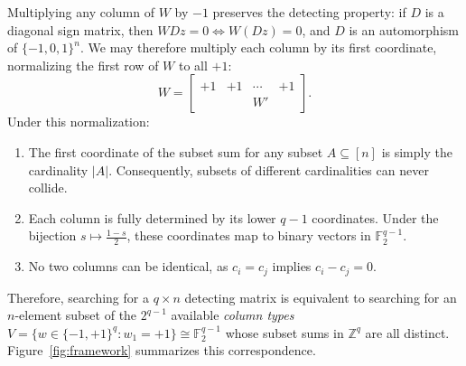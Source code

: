\documentclass[11pt]{article}
\theoremstyle{plain}
\theoremstyle{definition}
\newcommand{\signs}{\{-1,+1\}}
\newcommand{\ternary}{\{-1,0,1\}}
\begin{document}
Multiplying any column of $W$ by $-1$ preserves the detecting property: if $D$ is a diagonal sign matrix, then $WDz = 0 \iff W(Dz) = 0$, and $D$ is an automorphism of $\ternary^n$. We may therefore multiply each column by its first coordinate, normalizing the first row of $W$ to all $+1$:
\[
  W = \begin{bmatrix}
    +1 & +1 & \cdots & +1 \\
    & & W' &
  \end{bmatrix}.
\]
Under this normalization:
\begin{enumerate}[label=(\roman*)]
\item The first coordinate of the subset sum for any subset $A \subseteq [n]$ is simply the cardinality $|A|$. Consequently, subsets of different cardinalities can never collide.
\item Each column is fully determined by its lower $q-1$ coordinates. Under the bijection $s \mapsto \frac{1-s}{2}$, these coordinates map to binary vectors in $\mathbb{F}_2^{q-1}$.
\item No two columns can be identical, as $c_i = c_j$ implies $c_i - c_j = 0$.
\end{enumerate}
Therefore, searching for a $q \times n$ detecting matrix is equivalent to searching for an $n$-element subset of the $2^{q-1}$ available \emph{column types} $V = \{w \in \signs^q : w_1 = +1\} \cong \mathbb{F}_2^{q-1}$ whose subset sums in $\mathbb{Z}^q$ are all distinct. Figure~\ref{fig:framework} summarizes this correspondence.
\end{document}
